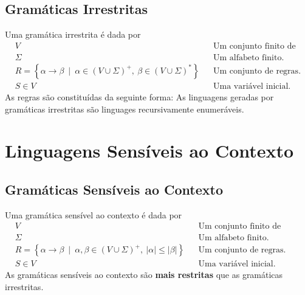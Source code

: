 \documentclass[11pt]{article}
\begin{document}
\subsection{Gramáticas Irrestritas}
\label{sec:org9890fbf}
Uma gramática irrestrita é dada por
\begin{align*}
  & V && \text{Um conjunto finito de variáveis.} \\
  & \Sigma && \text{Um alfabeto finito.} \\
  & R = \left\{ \alpha \to \beta \enspace\big|\enspace \alpha \in \left(V \cup \Sigma\right)^+,\> \beta \in \left(V \cup \Sigma\right)^* \right\} && \text{Um conjunto de regras.} \\
  & S \in V && \text{Uma variável inicial.}
\end{align*}
As regras são constituídas da seguinte forma:
As linguagens geradas por gramáticas irrestritas são linguages recursivamente
enumeráveis.
\section{Linguagens Sensíveis ao Contexto}
\label{sec:org83a93dd}
\subsection{Gramáticas Sensíveis ao Contexto}
\label{sec:orga707e7b}
Uma gramática sensível ao contexto é dada por
\begin{align*}
  & V && \text{Um conjunto finito de variáveis.} \\
  & \Sigma && \text{Um alfabeto finito.} \\
  & R = \left\{ \alpha \to \beta \enspace\big|\enspace \alpha, \beta \in \left(V \cup \Sigma\right)^+,\> |\alpha| \leq |\beta| \right\} && \text{Um conjunto de regras.} \\
  & S \in V && \text{Uma variável inicial.}
\end{align*}
As gramáticas sensíveis ao contexto são \textbf{mais restritas} que as gramáticas irrestritas.
\end{document}
